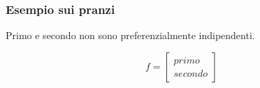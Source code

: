 \documentclass[\main/main.tex]{subfiles}
\begin{document}
\subsubsection{Esempio sui pranzi}
Primo e secondo non sono preferenzialmente indipendenti.

\[
  f = \begin{bmatrix}
    primo \\
    secondo
  \end{bmatrix}
\]
\end{document}

